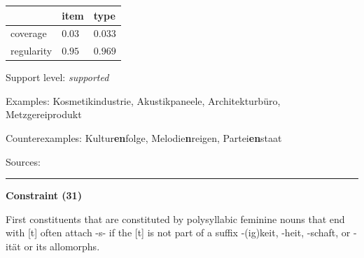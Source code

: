 \vspace{-0.25em}

\begin{table}[!ht]
\begin{center}
\setlength{\extrarowheight}{1pt}
\begin{tabularx}{\columnwidth}{|X|X|X|}
\hline
 & item & type \\
\hline
 coverage & $0.03$ & $0.033$ \\
\hline
 regularity & $0.95$ & $0.969$ \\
\hline
\end{tabularx}
\end{center}
\end{table}

\vspace{-1.35em}

\noindent
Support level: \textit{supported}

\vspace{0.3em}

\noindent
Examples: Kosmetik{\zeroLinker}industrie, Akustik{\zeroLinker}paneele, Architektur{\zeroLinker}büro, Metzgerei{\zeroLinker}produkt

\noindent
Counterexamples: Kultur\textbf{en}folge, Melodie\textbf{n}reigen, Partei\textbf{en}staat

\vspace{0.3em}

\noindent
Sources: \citet[107]{ortner_mueller-bollhagen_1991}

\vspace{0.35em}
\hrule




\vspace{0.4em}

\begin{center}
\textbf{Constraint (31)}
\end{center}

\noindent
First constituents that are constituted by polysyllabic feminine nouns that end with [t] often attach -s- if the [t] is not part of a suffix -(ig)keit, -heit, -schaft, or -ität or its allomorphs.
\vspace{0.5em}


